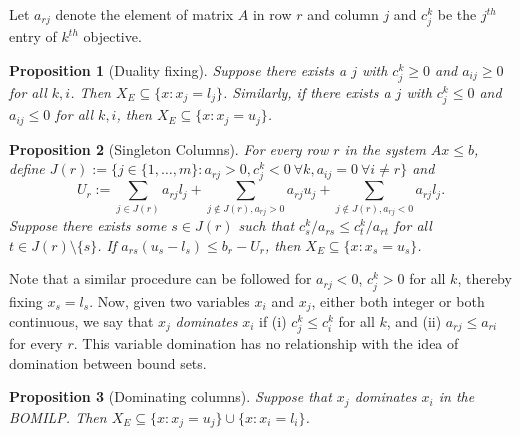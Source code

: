 \documentclass[11.5pt]{article}
\newtheorem{prop}{Proposition}
\begin{document}
Let $a_{rj}$ denote the element of matrix $A$ in row $r$ and column $j$ and $c^{k}_{j}$ be the $j^{th}$ entry of $k^{th}$ objective. 

\begin{prop}[Duality fixing]\label{duality_fixing}
Suppose there exists a $j$ with $c^k_j \geq 0$ and $a_{ij} \geq 0$ for all $k,i$. Then $X_{E}\subseteq \{x\colon x_j = l_j\}$. Similarly, if there exists a $j$ with $c^k_j \leq 0$ and $a_{ij} \leq 0$ for all $k,i$, then $X_{E}\subseteq \{x\colon x_j = u_j\}$.
\end{prop}



\begin{prop}[Singleton Columns]\label{singleton_columns}
\renewcommand{\gamma}{t}
For every row $r$ in the system $Ax\le b$, define ${J}(r) := \{j \in \{1,\dots,m\}: a_{rj} > 0, c_j^k < 0 \ \forall k, a_{ij} = 0 \ \forall i\neq r\}$ and \[{U}_r := \sum_{j\in {J}(r)} a_{rj}l_j + \sum_{j\not\in {J}(r), a_{rj} > 0} a_{rj}u_j + \sum_{j\not\in {J}(r), a_{rj} < 0} a_{rj}l_j.\] Suppose there exists some $s\in {J}(r)$ such that $c_s^k/a_{rs} \leq c_\gamma^k/a_{r\gamma}$ for all $\gamma \in {J}(r)\setminus\{s\}$. If $a_{rs}(u_s-l_s) \leq b_r - {U}_r$, then {$X_{E}\subseteq\{x\colon x_{s}=u_{s}\}$.}
\end{prop}

Note that a similar procedure can be followed for $a_{rj} < 0$, $c_j^k > 0$ for all $k$, thereby fixing $x_{s}=l_{s}$. Now, given two variables $x_{i}$ and $x_{j}$, either both integer or both continuous, we say that $x_j$ \emph{dominates} $x_i$ if (i) $c_j^k \leq c^k_i$ for all $k$, and (ii) $a_{r j} \leq a_{ri}$ for every $r$. This variable domination has no relationship with the idea of domination between bound sets. %


\begin{prop}[Dominating columns]\label{dominating_col_disjunction}
Suppose that $x_j$ dominates $x_i$ in the BOMILP. Then {$X_{E}\subseteq\{x\colon x_{j}=u_{j}\} \cup \{ x\colon x_{i}=l_{i}\}$.}
\end{prop}
\end{document}
